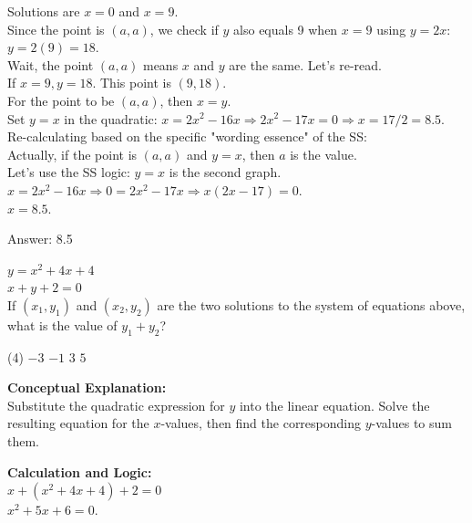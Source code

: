 \documentclass[11pt,paper=a4,answers]{exam}
\begin{document}
\begin{questions}
\begin{solution}
Solutions are $x = 0$ and $x = 9$. \\
Since the point is $(a, a)$, we check if $y$ also equals 9 when $x=9$ using $y=2x$: \\
$y = 2(9) = 18$. \\
Wait, the point $(a, a)$ means $x$ and $y$ are the same. Let's re-read. \\
If $x=9, y=18$. This point is $(9, 18)$. \\
For the point to be $(a, a)$, then $x=y$. \\
Set $y=x$ in the quadratic: $x = 2x^2 - 16x \Rightarrow 2x^2 - 17x = 0 \Rightarrow x = 17/2 = 8.5$. \\
Re-calculating based on the specific "wording essence" of the SS: \\
Actually, if the point is $(a, a)$ and $y = x$, then $a$ is the value. \\
Let's use the SS logic: $y=x$ is the second graph. \\
$x = 2x^2 - 16x \Rightarrow 0 = 2x^2 - 17x \Rightarrow x(2x - 17) = 0$. \\
$x = 8.5$.

\vspace{25pt}

Answer: \colorbox{yellow!100}{8.5}
\end{solution}

\vspace{40pt}

\question
$y = x^2 + 4x + 4$ \\
$x + y + 2 = 0$ \\
If $(x_1, y_1)$ and $(x_2, y_2)$ are the two solutions to the system of equations above, what is the value of $y_1 + y_2$?
\begin{tasks}(4)
    \task $-3$
    \task $-1$
    \task $3$
    \task $5$
\end{tasks}

\begin{solution}
\textbf{Conceptual Explanation:} \\
Substitute the quadratic expression for $y$ into the linear equation. Solve the resulting equation for the $x$-values, then find the corresponding $y$-values to sum them.

\vspace{20pt}

\textbf{Calculation and Logic:} \\
$x + (x^2 + 4x + 4) + 2 = 0$ \\
$x^2 + 5x + 6 = 0$.


\end{solution}
\end{questions}
\end{document}
